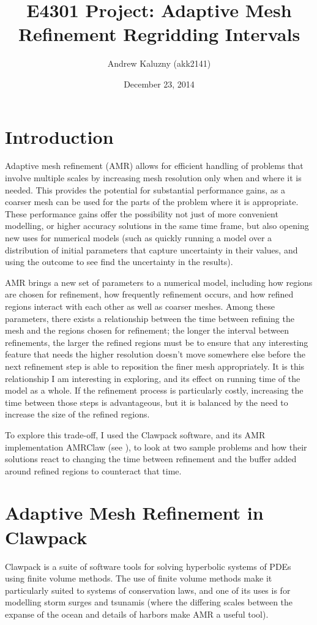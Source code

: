 \documentclass[11pt]{article}
\title{E4301 Project: Adaptive Mesh Refinement Regridding Intervals}
\author{Andrew Kaluzny (akk2141)}
\date{December 23, 2014}
\begin{document}
\maketitle

\section*{Introduction}
Adaptive mesh refinement (AMR) allows for efficient handling of problems
that involve multiple scales by increasing mesh resolution only when and
where it is needed. This provides the potential for substantial performance
gains, as a coarser mesh can be used for the parts of the problem where it
is appropriate. These performance gains offer the possibility not just of
more convenient modelling, or higher accuracy solutions in the same time
frame, but also opening new uses for numerical models (such as quickly
running a model over a distribution of initial parameters that capture
uncertainty in their values, and using the outcome to see find the uncertainty
in the results).

AMR brings a new set of parameters to a numerical model, including how 
regions are chosen for refinement, how frequently refinement occurs,
and how refined regions interact with each other as well as coarser meshes.
Among these parameters, there exists a relationship between the 
time between refining the mesh
and the regions chosen for refinement; the longer the interval between
refinements, the larger the refined regions must be to ensure that any
interesting feature that needs the higher resolution doesn't move somewhere
else before the next refinement step is able to reposition the finer mesh
appropriately. It is this relationship I am interesting in exploring, and
its effect on running time of the model as a whole. If the refinement process
is particularly costly, increasing the time between those steps is advantageous,
but it is balanced by the need to increase the size of the refined regions.

To explore this trade-off, I used the Clawpack software,
and its AMR implementation AMRClaw (see \cite{clawpack}), 
to look at two sample problems and how
their solutions react to changing the time between refinement and the buffer
added around refined regions to counteract that time.

\section*{Adaptive Mesh Refinement in Clawpack}
Clawpack is a suite of software tools for solving hyperbolic systems of
PDEs using finite volume methods. The use of finite volume methods make it
particularly suited to systems of conservation laws, and one of its uses
is for modelling storm surges and tsunamis (where the differing scales 
between the expanse of the ocean and details of harbors make AMR a useful
tool).
\end{document}
